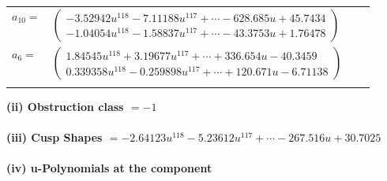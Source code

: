 \documentclass[1p]{elsarticle_modified}
\theoremstyle{definition}
\begin{document}
\begin{tabular}{m{7pt} m{180pt} m{7pt} m{180pt} }
\flushright $a_{10}=$&$\begin{pmatrix}-3.52942 u^{118}-7.11188 u^{117}+\cdots-628.685 u+45.7434\\-1.04054 u^{118}-1.58837 u^{117}+\cdots-43.3753 u+1.76478\end{pmatrix}$ \\
\flushright $a_{6}=$&$\begin{pmatrix}1.84545 u^{118}+3.19677 u^{117}+\cdots+336.654 u-40.3459\\0.339358 u^{118}-0.259898 u^{117}+\cdots+120.671 u-6.71138\end{pmatrix}$\\&\end{tabular}
\flushleft \textbf{(ii) Obstruction class $= -1$}\\~\\
\flushleft \textbf{(iii) Cusp Shapes $= -2.64123 u^{118}-5.23612 u^{117}+\cdots-267.516 u+30.7025$}\\~\\
\newpage\renewcommand{\arraystretch}{1}
\flushleft \textbf{(iv) u-Polynomials at the component}\newline \\
\end{document}
